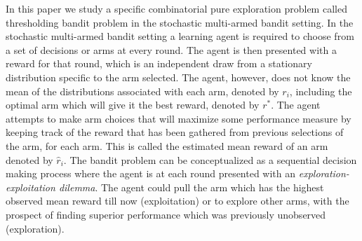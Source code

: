 In this paper we study a specific combinatorial pure exploration problem called thresholding bandit problem in the stochastic multi-armed bandit setting. In the stochastic multi-armed bandit setting a learning agent is required to choose from a set of decisions or arms at every round. The agent is then presented with a reward for that round, which is an independent draw from a stationary distribution specific to the arm selected. The agent, however, does not know the mean of the distributions associated with each arm, denoted by $r_{i}$, including the optimal arm which will give it the best reward, denoted by $r^{*}$. The agent attempts to make arm choices that will maximize some performance measure by keeping track of the reward that has been gathered from previous selections of the arm, for each arm. This is called the estimated mean reward of an arm denoted by $\hat{r}_{i}$. The bandit problem can be conceptualized as a sequential decision making process where the agent is at each round presented with an \emph{exploration-exploitation dilemma}. The agent could pull the arm which has the highest observed mean reward till now (exploitation) or to explore other arms, with the prospect of finding superior performance which was previously unobserved (exploration). 

%
%

